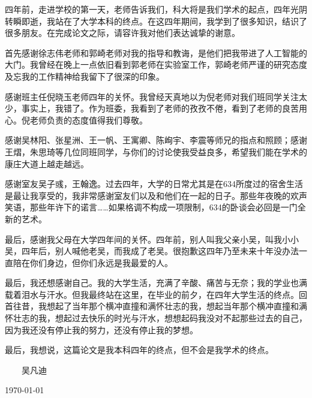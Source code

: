 ﻿
\begin{thanks}

四年前，走进学校的第一天，老师告诉我们，科大将是我们学术的起点，四年光阴转瞬即逝，我站在了大学本科的终点。在这四年期间，我学到了很多知识，结识了很多朋友。在完成论文之际，请容许我对他们表达诚挚的谢意。

首先感谢徐志伟老师和郭崎老师对我的指导和教诲，是他们把我带进了人工智能的大门。我曾经在晚上一点依旧看到郭老师在实验室工作，郭崎老师严谨的研究态度及忘我的工作精神给我留下了很深的印象。

感谢班主任倪晓玉老师四年的关怀。我曾经天真地以为倪老师对我们班同学关注太少，事实上，我错了。作为班委，我看到了老师的孜孜不倦，看到了老师的良苦用心。倪老师负责的态度值得我们尊敬。

感谢吴林阳、张星洲、王一帆、王寓卿、陈峋宇、李震等师兄的指点和照顾；感谢王熠，朱思琦等几位同班同学，与你们的讨论使我受益良多，希望我们能在学术的康庄大道上越走越远。

感谢室友吴子彧，王翰逸。过去四年，大学的日常尤其是在634所度过的宿舍生活是最让我享受的，我非常感谢室友们以及和他们在一起的日子。那些年夜晚的欢声笑语，那些年许下的诺言……如果格调不构成一项限制，634的卧谈会必回是一门全新的艺术。

最后，感谢我父母在大学四年间的关怀。四年前，别人叫我父亲小吴，叫我小小吴，四年后，别人喊他老吴，而我成了老吴。很抱歉这四年乃至未来十年没办法一直陪在你们身边，但你们永远是我最爱的人。

最后，我还想感谢自己。我的大学生活，充满了辛酸、痛苦与无奈；我的学业也满载着泪水与汗水。但我最终站在这里，在毕业的前夕，在四年大学生活的终点。回首往昔，我想起了当年那个横冲直撞和满怀壮志的我，想起当年那个横冲直撞和满怀壮志的我，想起过去快乐的时光与汗水，想想起码我没对不起那些过去的自己，因为我还没有停止我的努力，还没有停止我的梦想。

最后，我想说，这篇论文是我本科四年的终点，但不会是我学术的终点。
\vskip 18pt

\begin{flushright}

~~~~吴凡迪~~~~

\today

\end{flushright}

\end{thanks}
